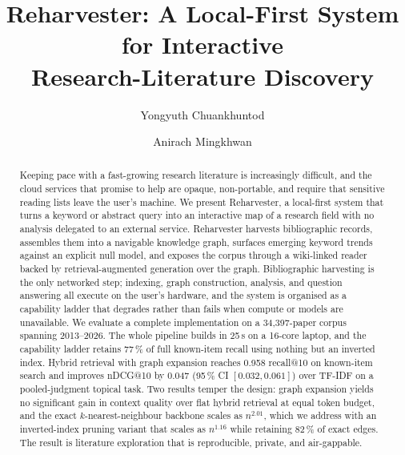 \documentclass[runningheads]{llncs}
\begin{document}
\title{Reharvester: A Local-First System for Interactive\\ Research-Literature Discovery}


\author{Yongyuth Chuankhuntod \and
Anirach Mingkhwan}



\maketitle

\begin{abstract}
Keeping pace with a fast-growing research literature is increasingly difficult, and
the cloud services that promise to help are opaque, non-portable, and require that
sensitive reading lists leave the user's machine. We present Reharvester, a
local-first system that turns a keyword or abstract query into an interactive map of a
research field with no analysis delegated to an external service. Reharvester harvests
bibliographic records, assembles them into a navigable knowledge graph, surfaces
emerging keyword trends against an explicit null model, and exposes the corpus
through a wiki-linked reader backed by retrieval-augmented generation over the graph.
Bibliographic harvesting is the only networked step; indexing, graph
construction, analysis, and question answering all execute on the user's hardware, and
the system is organised as a capability ladder that degrades rather than fails when
compute or models are unavailable. We evaluate a complete implementation on a 34{,}397-paper corpus spanning 2013--2026.
The whole pipeline builds in 25\,s on a 16-core laptop, and the capability ladder
retains 77\,\% of full known-item recall using nothing but an inverted index. Hybrid
retrieval with graph expansion reaches 0.958 recall@10 on known-item search and improves
nDCG@10 by 0.047 (95\,\% CI $[0.032, 0.061]$) over TF-IDF on a pooled-judgment topical
task. Two results temper the design: graph expansion yields no significant gain in
context quality over flat hybrid retrieval at equal token budget, and the exact
$k$-nearest-neighbour backbone scales as $n^{2.01}$, which we address with an
inverted-index pruning variant that scales as $n^{1.16}$ while retaining 82\,\% of exact
edges. The result is literature exploration that is reproducible, private, and
air-gappable.

\end{abstract}
\end{document}
